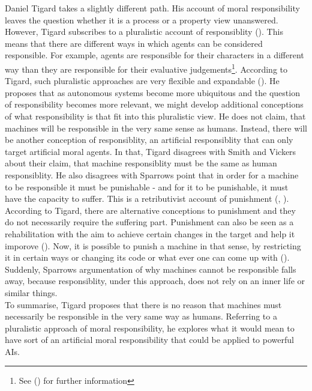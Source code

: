 \documentclass{article}
\newcounter{example}
\begin{document}
Daniel Tigard takes a slightly different path. His account of moral
responsibility leaves the question whether it is a process or a property
view unanswered. However, Tigard subscribes to a pluralistic account of
responsiblity (\cite[p. 442-444]{tigard2021artificial}). This means that there
are different ways in which agents can be considered responsible. For example,
agents are responsible for their characters in a different way than they are
responsible for their evaluative judgements\footnote{See (\cite{Shoemaker_2011})
for further information}. According to Tigard, such pluralistic approaches are
very flexible and expandable (\cite[p. 442-444]{tigard2021artificial}). He
proposes that as autonomous systems become more ubiquitous and the question of
responsibility becomes more relevant, we might develop additional conceptions of
what responsibility is that fit into this pluralistic view. He does not claim, that
machines will be responsible in the very same sense as humans. Instead, there
will be another conception of responsiblity, an artificial responsiblity that
can only target artificial moral agents. In that, Tigard disagrees with Smith
and Vickers about their claim, that machine responsiblity must be the same as
human responsiblity. He also disagrees with Sparrows point that in order for a
machine to be responsible it must be punishable - and for it to be punishable,
it must have the capacity to suffer.  This is a retributivist account of
punishment (\cite[p. 77]{sparrow2007killer}, \cite[p.
441]{tigard2021artificial}). According to Tigard, there are alternative
conceptions to punishment and they do not necessarily require the suffering
part. Punishment can also be seen as a rehabilitation with the aim to achieve
certain changes in the target and help it imporove (\cite[p.
442]{tigard2021artificial}). Now, it is possible to punish a machine in that
sense, by restricting it in certain ways or changing its code or what ever one
can come up with (\cite[p. 443]{tigard2021artificial}). Suddenly, Sparrows
argumentation of why machines cannot be responsible falls away, because
responsiblity, under this approach, does not rely on an inner life or similar
things.\\
To summarise, Tigard proposes that there is no reason that machines must
necessarily be responsible in the very same way as humans. Referring to a
pluralistic approach of moral responsibility, he explores what it would mean to
have sort of an artificial moral responsibility that could be applied to
powerful AIs.\\
\end{document}
